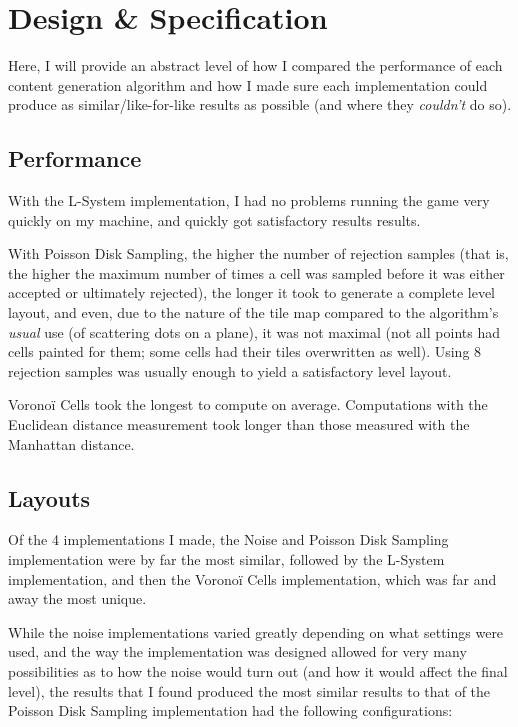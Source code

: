 \chapter{Design \& Specification}
  
% 

Here, I will provide an abstract level of how I compared the performance of each content generation algorithm and how I made sure each implementation could produce as similar/like-for-like results as possible (and where they \textit{couldn't} do so).

\section{Performance}

With the L-System implementation, I had no problems running the game very quickly on my machine, and quickly got satisfactory results results.

With Poisson Disk Sampling, the higher the number of rejection samples (that is, the higher the maximum number of times a cell was sampled before it was either accepted or ultimately rejected), the longer it took to generate a complete level layout, and even, due to the nature of the tile map compared to the algorithm's \textit{usual} use (of scattering dots on a plane), it was not maximal (not all points had cells painted for them; some cells had their tiles overwritten as well). Using 8 rejection samples was usually enough to yield a satisfactory level layout.

Voronoï Cells took the longest to compute on average. Computations with the Euclidean distance measurement took longer than those measured with the Manhattan distance.

\section{Layouts}

Of the 4 implementations I made, the Noise and Poisson Disk Sampling implementation were by far the most similar, followed by the L-System implementation, and then the Voronoï Cells implementation, which was far and away the most unique.

While the noise implementations varied greatly depending on what settings were used, and the way the implementation was designed allowed for very many possibilities as to how the noise would turn out (and how it would affect the final level), the results that I found produced the most similar results to that of the Poisson Disk Sampling implementation had the following configurations:

